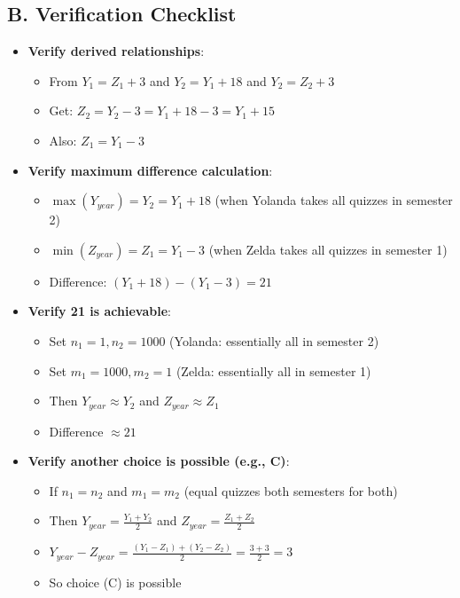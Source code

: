 \documentclass[12pt]{article}
\begin{document}
\begin{verificationbox}
\subsection*{B. Verification Checklist}
\begin{itemize}[leftmargin=*]
    \item \textbf{Verify derived relationships}:
    \begin{itemize}
        \item From $Y_1 = Z_1 + 3$ and $Y_2 = Y_1 + 18$ and $Y_2 = Z_2 + 3$
        \item Get: $Z_2 = Y_2 - 3 = Y_1 + 18 - 3 = Y_1 + 15$ \checkmark
        \item Also: $Z_1 = Y_1 - 3$ \checkmark
    \end{itemize}
    \item \textbf{Verify maximum difference calculation}:
    \begin{itemize}
        \item $\max(Y_{year}) = Y_2 = Y_1 + 18$ (when Yolanda takes all quizzes in semester 2)
        \item $\min(Z_{year}) = Z_1 = Y_1 - 3$ (when Zelda takes all quizzes in semester 1)
        \item Difference: $(Y_1 + 18) - (Y_1 - 3) = 21$ \checkmark
    \end{itemize}
    \item \textbf{Verify 21 is achievable}:
    \begin{itemize}
        \item Set $n_1 = 1, n_2 = 1000$ (Yolanda: essentially all in semester 2)
        \item Set $m_1 = 1000, m_2 = 1$ (Zelda: essentially all in semester 1)
        \item Then $Y_{year} \approx Y_2$ and $Z_{year} \approx Z_1$
        \item Difference $\approx 21$ \checkmark
    \end{itemize}
    \item \textbf{Verify another choice is possible (e.g., C)}:
    \begin{itemize}
        \item If $n_1 = n_2$ and $m_1 = m_2$ (equal quizzes both semesters for both)
        \item Then $Y_{year} = \frac{Y_1 + Y_2}{2}$ and $Z_{year} = \frac{Z_1 + Z_2}{2}$
        \item $Y_{year} - Z_{year} = \frac{(Y_1 - Z_1) + (Y_2 - Z_2)}{2} = \frac{3 + 3}{2} = 3$ \checkmark
        \item So choice (C) is possible
    \end{itemize}
\end{itemize}


\end{verificationbox}
\end{document}
